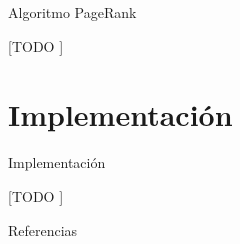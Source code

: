\documentclass[12pt]{beamer}
\begin{document}
    \begin{frame}[fragile]{Algoritmo PageRank}

      [TODO ]

    \end{frame}

  \section{Implementación}

    \begin{frame}[fragile]{Implementación}

      [TODO ]

    \end{frame}



    \begin{frame}[allowframebreaks]{Referencias}

      
      

    \end{frame}
\end{document}
